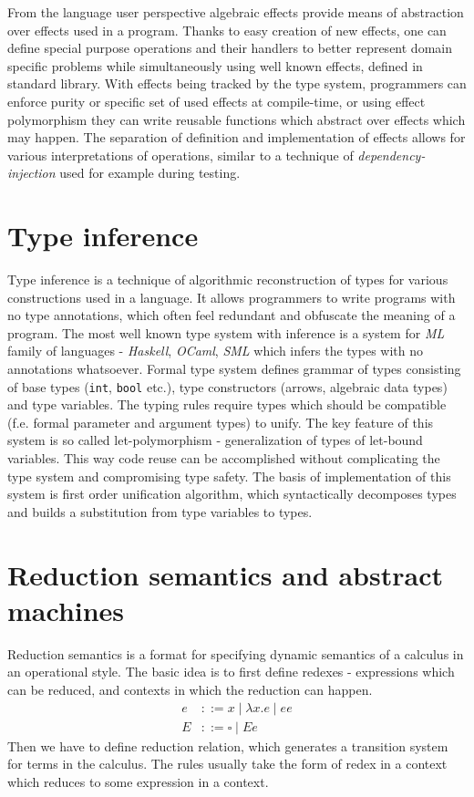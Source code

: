 \documentclass[inz, english, shortabstract]{iithesis}
\begin{document}
From the language user perspective algebraic effects provide means of abstraction over effects used in a program.
Thanks to easy creation of new effects, one can define special purpose operations and their handlers to better represent domain specific problems while simultaneously using well known effects, defined in standard library.
With effects being tracked by the type system, programmers can enforce purity or specific set of used effects at compile-time, or using effect polymorphism they can write reusable functions which abstract over effects which may happen.
The separation of definition and implementation of effects allows for various interpretations of operations, similar to a technique of \emph{dependency-injection} used for example during testing.

\section{Type inference}
Type inference is a technique of algorithmic reconstruction of types for various constructions used in a language.
It allows programmers to write programs with no type annotations, which often feel redundant and obfuscate the meaning of a program.
The most well known type system with inference is a system for \emph{ML} family of languages - \emph{Haskell}, \emph{OCaml}, \emph{SML} which infers the types with no annotations whatsoever.
Formal type system defines grammar of types consisting of base types (\texttt{int}, \texttt{bool} etc.), type constructors (arrows, algebraic data types) and type variables.
The typing rules require types which should be compatible (f.e. formal parameter and argument types) to unify.
The key feature of this system is so called let-polymorphism - generalization of types of let-bound variables.
This way code reuse can be accomplished without complicating the type system and compromising type safety.
The basis of implementation of this system is first order unification algorithm, which syntactically decomposes types and builds a substitution from type variables to types.

\section{Reduction semantics and abstract machines}
Reduction semantics is a format for specifying dynamic semantics of a calculus in an operational style.
The basic idea is to first define redexes - expressions which can be reduced, and contexts in which the reduction can happen.
\begin{align*}
  e &::= x \mid \lambda x . e \mid e e \\
  E &::= \square \mid E e
\end{align*}
Then we have to define reduction relation, which generates a transition system for terms in the calculus.
The rules usually take the form of redex in a context which reduces to some expression in a context.
\end{document}
